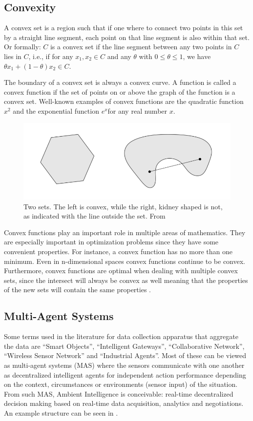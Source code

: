 \subsection{Convexity}
\label{sec:convex}
A convex set is a region such that if one where to connect two points in this set by a straight line segment, each point on that line segment is also within that set. Or formally: $C$ is a convex set if the line segment between any two points in $C$ lies in $C$, i.e., if for any $x_1, x_2 \in C$ and any $\theta$ with $0 \leq \theta \leq 1$, we have $\theta x_1 + (1 - \theta )x_2 \in C$.

The boundary of a convex set is always a convex curve. A function is called a convex function if the set of points on or above the graph of the function is a convex set. Well-known examples of convex functions are the quadratic function $x^{2}$ and the exponential function $e^{x} $for any real number $x$.

\begin{figure}[h]
	\centering
	\includegraphics[width=0.7\linewidth]{img/convex}
	\caption{Two sets. The left is convex, while the right, kidney shaped is not, as indicated with the line outside the set. From \citep{boyd2004convex}}
	\label{fig:convex}
\end{figure}


Convex functions play an important role in multiple areas of mathematics. They are especially important in optimization problems since they have some convenient properties. For instance, a convex function has no more than one minimum. Even in n-dimensional spaces convex functions continue to be convex. Furthermore, convex functions are optimal when dealing with multiple convex sets, since the intersect will always be convex as well meaning that the properties of the new sets will contain the same properties  \citep{boyd2004convex}. 
\subsection{Multi-Agent Systems}

Some terms used in the literature for data collection apparatus that aggregate the data are ``Smart Objects'', ``Intelligent Gateways'', ``Collaborative Network'', ``Wireless Sensor Network'' and ``Industrial Agents''. Most of these can be viewed as multi-agent systems (MAS) where the sensors communicate with one another as decentralized intelligent agents for independent action performance depending on the context, circumstances or environments (sensor input) of the situation. From such MAS, Ambient Intelligence  is conceivable: real-time decentralized decision making based on real-time data acquisition, analytics and negotiations. An example structure can be seen in .

